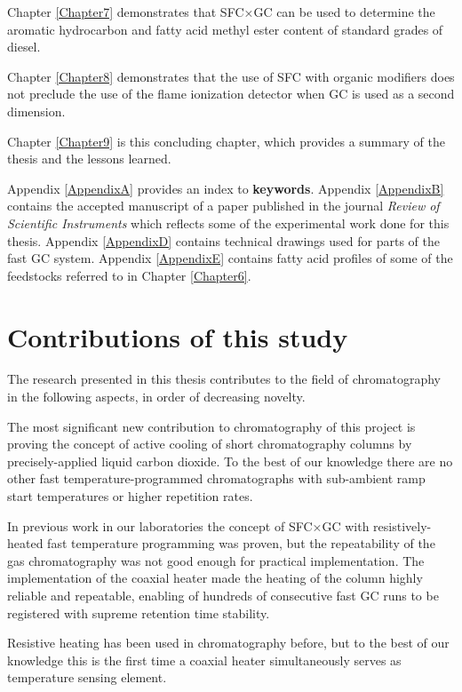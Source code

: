 Chapter \ref{Chapter7} demonstrates that SFC×GC can be used to determine the
aromatic hydrocarbon and fatty acid methyl ester content of standard grades of
diesel. 

Chapter \ref{Chapter8} demonstrates that the use of SFC with organic modifiers
does not preclude the use of the flame ionization detector when GC is used as a
second dimension.

Chapter \ref{Chapter9} is this concluding chapter, which provides a summary of
the thesis and the lessons learned.

Appendix \ref{AppendixA} provides an index to \textbf{keywords}. Appendix
\ref{AppendixB} contains the accepted manuscript of a paper published in the
journal \textit{Review of Scientific Instruments} which reflects some of the
experimental work done for this thesis. Appendix \ref{AppendixD} contains
technical drawings used for parts of the fast GC system. Appendix
\ref{AppendixE} contains fatty acid profiles of some of the feedstocks referred
to in Chapter \ref{Chapter6}.


\section{Contributions of this study}

The research presented in this thesis contributes to the field of chromatography
in the following aspects, in order of decreasing novelty.

The most significant new contribution to chromatography of this project is
proving the concept of active cooling of short chromatography columns by
precisely-applied liquid carbon dioxide. To the best of our knowledge there are
no other fast temperature-programmed chromatographs with sub-ambient ramp start
temperatures or higher repetition rates.

In previous work in our laboratories the concept of SFC×GC with
resistively-heated fast temperature programming \autocite{Venter2004,
Venter2006} was proven, but the repeatability of the gas chromatography was not
good enough for practical implementation. The implementation of the coaxial
heater made the heating of the column highly reliable and repeatable, enabling
of hundreds of consecutive fast GC runs to be registered with supreme retention
time stability.

Resistive heating has been used in chromatography before, but to the best of our
knowledge this is the first time a coaxial heater simultaneously serves as
temperature sensing element.

